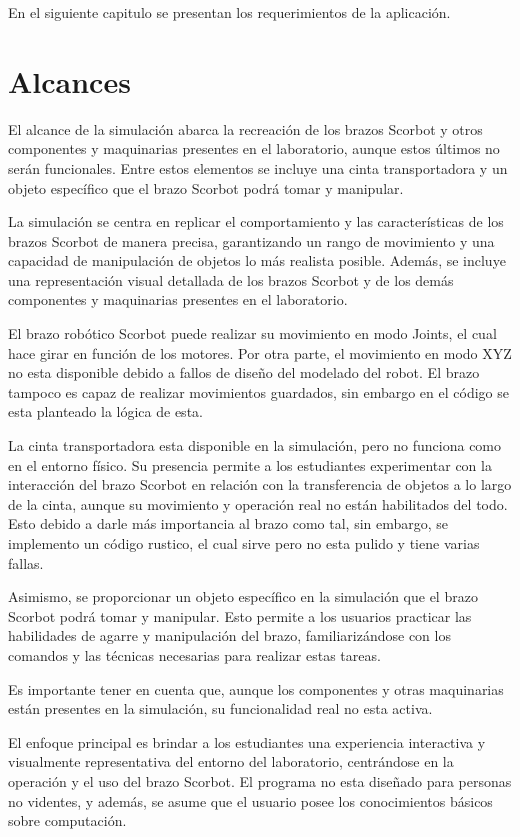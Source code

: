 En el siguiente capitulo se presentan los requerimientos de la aplicación.

\section{Alcances}
El alcance de la simulación abarca la recreación de los brazos Scorbot y otros componentes y maquinarias presentes en el laboratorio, aunque estos últimos no serán funcionales. Entre estos elementos se incluye una cinta transportadora y un objeto específico que el brazo Scorbot podrá tomar y manipular.

La simulación se centra en replicar el comportamiento y las características de los brazos Scorbot de manera precisa, garantizando un rango de movimiento y una capacidad de manipulación de objetos lo más realista posible. Además, se incluye una representación visual detallada de los brazos Scorbot y de los demás componentes y maquinarias presentes en el laboratorio.

El brazo robótico Scorbot puede realizar su movimiento en modo Joints, el cual hace girar en función de los motores. Por otra parte, el movimiento en modo XYZ no esta disponible debido a fallos de diseño del modelado del robot. El brazo tampoco es capaz de realizar movimientos guardados, sin embargo en el código se esta planteado la lógica de esta.

La cinta transportadora esta disponible en la simulación, pero no funciona como en el entorno físico. Su presencia permite a los estudiantes experimentar con la interacción del brazo Scorbot en relación con la transferencia de objetos a lo largo de la cinta, aunque su movimiento y operación real no están habilitados del todo. Esto debido a darle más importancia al brazo como tal, sin embargo, se implemento un código rustico, el cual sirve pero no esta pulido y tiene varias fallas.

Asimismo, se proporcionar un objeto específico en la simulación que el brazo Scorbot podrá tomar y manipular. Esto permite a los usuarios practicar las habilidades de agarre y manipulación del brazo, familiarizándose con los comandos y las técnicas necesarias para realizar estas tareas.

Es importante tener en cuenta que, aunque los componentes y otras maquinarias están presentes en la simulación, su funcionalidad real no esta activa. 

El enfoque principal es brindar a los estudiantes una experiencia interactiva y visualmente representativa del entorno del laboratorio, centrándose en la operación y el uso del brazo Scorbot. El programa no esta diseñado para personas no videntes, y además, se asume que el usuario posee los conocimientos básicos sobre computación.

